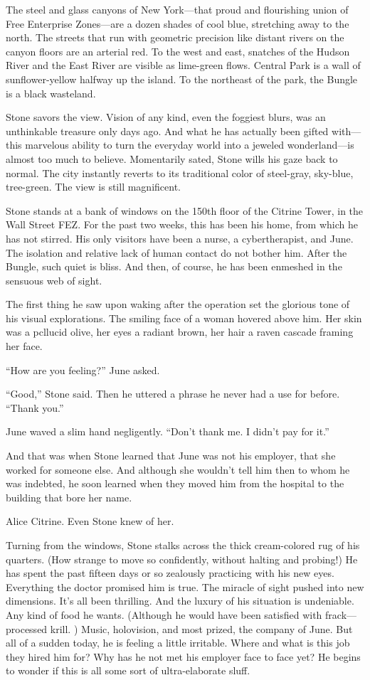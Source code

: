 The steel and glass canyons of New York—that proud and flourishing union of Free Enterprise Zones—are a dozen shades of cool blue, stretching away to the north. The streets that run with geometric precision like distant rivers on the canyon floors are an arterial red. To the west and east, snatches of the Hudson River and the East River are visible as lime-green flows. Central Park is a wall of sunflower-yellow halfway up the island. To the northeast of the park, the Bungle is a black wasteland.

Stone savors the view. Vision of any kind, even the foggiest blurs, was an unthinkable treasure only days ago. And what he has actually been gifted with—this marvelous ability to turn the everyday world into a jeweled wonderland—is almost too much to believe. Momentarily sated, Stone wills his gaze back to normal. The city instantly reverts to its traditional color of steel-gray, sky-blue, tree-green. The view is still magnificent.

Stone stands at a bank of windows on the 150th floor of the Citrine Tower, in the Wall Street FEZ. For the past two weeks, this has been his home, from which he has not stirred. His only visitors have been a nurse, a cybertherapist, and June. The isolation and relative lack of human contact do not bother him. After the Bungle, such quiet is bliss. And then, of course, he has been enmeshed in the sensuous web of sight.

The first thing he saw upon waking after the operation set the glorious tone of his visual explorations. The smiling face of a woman hovered above him. Her skin was a pcllucid olive, her eyes a radiant brown, her hair a raven cascade framing her face.

“How are you feeling?” June asked.

“Good,” Stone said. Then he uttered a phrase he never had a use for before. “Thank you.”

June waved a slim hand negligently. “Don’t thank me. I didn’t pay for it.”

And that was when Stone learned that June was not his employer, that she worked for someone else. And although she wouldn’t tell him then to whom he was indebted, he soon learned when they moved him from the hospital to the building that bore her name.

Alice Citrine. Even Stone knew of her.

Turning from the windows, Stone stalks across the thick cream-colored rug of his quarters. (How strange to move so confidently, without halting and probing!) He has spent the past fifteen days or so zealously practicing with his new eyes. Everything the doctor promised him is true. The miracle of sight pushed into new dimensions. It’s all been thrilling. And the luxury of his situation is undeniable. Any kind of food he wants. (Although he would have been satisfied with frack—processed krill. ) Music, holovision, and most prized, the company of June. But all of a sudden today, he is feeling a little irritable. Where and what is this job they hired him for? Why has he not met his employer face to face yet? He begins to wonder if this is all some sort of ultra-elaborate sluff.

